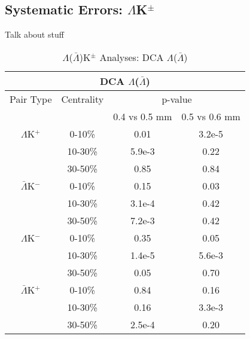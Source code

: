 \documentclass[../AnalysisNoteJBuxton.tex]{subfiles}
\begin{document}
\subsection{Systematic Errors: \texorpdfstring{$\Lambda$K$^{\pm}$}{TEXT}}
\label{SysErrsLamKch}

Talk about stuff

\begin{table}
 \centering
 \begin{tabular}{|c|c|c|c|}
 \multicolumn{4}{c}{DCA $\Lambda$($\bar{\Lambda}$)} \\
  \hline
  Pair Type & Centrality & \multicolumn{2}{c|}{p-value} \\
  \cline{3-4}
   & & 0.4 vs 0.5 mm & 0.5 vs 0.6 mm \\
  \hline
  $\Lambda$K$^{+}$ & 0-10\% & 0.01 & 3.2e-5 \\
   & 10-30\% & 5.9e-3 & 0.22 \\
   & 30-50\% & 0.85 & 0.84 \\
  \hline
  $\bar{\Lambda}$K$^{-}$ & 0-10\% & 0.15 & 0.03 \\
   & 10-30\% & 3.1e-4 & 0.42 \\
   & 30-50\% & 7.2e-3 & 0.42 \\
  \hline \hline
  $\Lambda$K$^{-}$ & 0-10\% & 0.35 & 0.05 \\
   & 10-30\% & 1.4e-5 & 5.6e-3 \\
   & 30-50\% & 0.05 & 0.70 \\
  \hline
  $\bar{\Lambda}$K$^{+}$ & 0-10\% & 0.84 & 0.16 \\
   & 10-30\% & 0.16 & 3.3e-3 \\
   & 30-50\% & 2.5e-4 & 0.20 \\
  \hline
 \end{tabular}
 \caption{$\Lambda$($\bar{\Lambda}$)K$^{\pm}$ Analyses: DCA $\Lambda$($\bar{\Lambda}$)}
 \label{tab:V0DcaLamKch}
\end{table}
\end{document}
